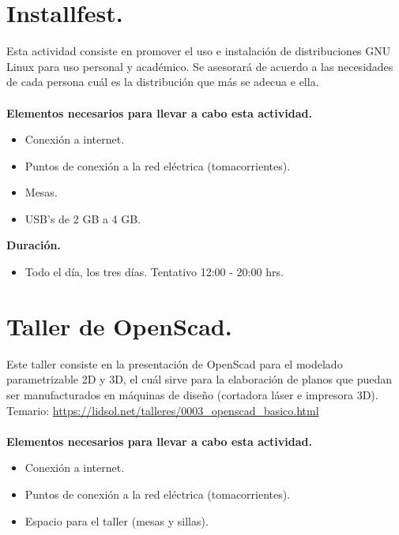 \documentclass[a4paper,11pt]{article}                 %
\begin{document}
  
    \section{Installfest.}                                     %
    Esta actividad consiste en promover el uso e instalación de distribuciones GNU Linux para uso personal y académico. Se asesorará de acuerdo a las necesidades de cada persona cuál es la distribución que más se adecua e ella.
  \paragraph{}
   \textbf{Elementos necesarios para llevar a cabo esta actividad.}
  \begin{itemize}
    \item Conexión a internet.
    \item Puntos de conexión a la red eléctrica (tomacorrientes).
    \item Mesas.
    \item USB's de 2 GB a 4 GB.
  \end{itemize}
  
  \textbf{Duración.}
  \begin{itemize}
    \item Todo el día, los tres días. Tentativo 12:00 - 20:00 hrs.
  \end{itemize}
  
      \section{Taller de OpenScad.}                                     %

  Este taller consiste en la presentación de OpenScad para el modelado parametrizable 2D y 3D, el cuál sirve para la elaboración de planos que puedan ser manufacturados en máquinas de diseño (cortadora láser e impresora 3D).
  Temario: \url{https://lidsol.net/talleres/0003_openscad_basico.html}
      \paragraph{}
  \textbf{Elementos necesarios para llevar a cabo esta actividad.}
  \begin{itemize}
    \item Conexión a internet.
    \item Puntos de conexión a la red eléctrica (tomacorrientes).
    \item Espacio para el taller (mesas y sillas).
  \end{itemize}
  
\end{document}
